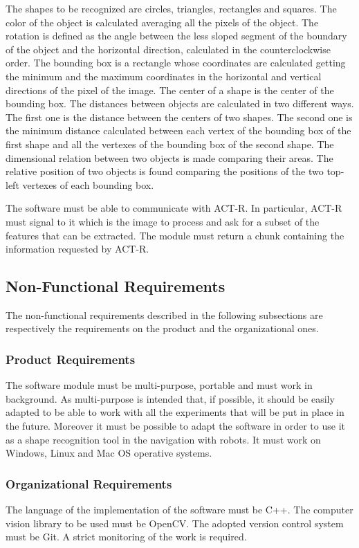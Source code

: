 		The shapes to be recognized are circles, triangles, rectangles and squares. 
		The color of the object is calculated averaging all the pixels of the object.
		The rotation is defined as the angle between the less sloped segment of the boundary of the object and the horizontal direction, calculated in the counterclockwise order.
		The bounding box is a rectangle whose coordinates are calculated getting the minimum and the maximum coordinates in the horizontal and vertical directions of the pixel of the image. 
		The center of a shape is the center of the bounding box.
		The distances between objects are calculated in two different ways. The first one is the distance between the centers of two shapes. The second one is the minimum distance calculated between each vertex of the bounding box of the first shape and all the vertexes of the bounding box of the second shape.
		The dimensional relation between two objects is made comparing their areas. 
		The relative position of two objects is found comparing the positions of the two top-left vertexes of each bounding box.

		The software must be able to communicate with ACT-R. 
		In particular, ACT-R must signal to it which is the image to process and ask for a subset of the features that can be extracted. The module must return a chunk containing the information requested by ACT-R.

		\subsection{Non-Functional Requirements}
		The non-functional requirements described in the following subsections are respectively the requirements on the product and the organizational ones.

			\subsubsection{Product Requirements}
			The software module must be multi-purpose, portable and must work in background.
			As multi-purpose is intended that, if possible, it should be easily adapted to be able to work with all the experiments that will be put in place in the future. Moreover it must be possible to adapt the software in order to use it as a shape recognition tool in the navigation with robots. %
			It must work on Windows, Linux and Mac OS operative systems.
	
			\subsubsection{Organizational Requirements}
			The language of the implementation of the software must be C++. 
			The computer vision library to be used must be OpenCV.
			The adopted version control system must be Git.
			A strict monitoring of the work is required.





